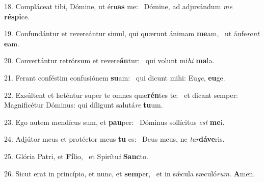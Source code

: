18. Compláceat tibi, Dómine, ut éru\textbf{as} me: \ast\  Dómine, ad adjuvándum \textit{me} \textbf{ré}\textbf{spi}ce.\

19. Confundántur et revereántur simul, qui quærunt ánimam \textbf{me}am, \ast\  ut áufe\textit{rant} \textbf{e}am.\

20. Convertántur retrórsum et revere\textbf{án}tur: \ast\  qui volunt mi\textit{hi} \textbf{ma}la.\

21. Ferant conféstim confusiónem \textbf{su}am: \ast\  qui dicunt mihi: Eu\textit{ge}, \textbf{eu}ge.\

22. Exsúltent et læténtur super te omnes quæ\textbf{rén}tes te: \ast\  et dicant semper: Magnificétur Dóminus: qui díligunt salutá\textit{re} \textbf{tu}um.\

23. Ego autem mendícus sum, et \textbf{pau}per: \ast\  Dóminus sollícitus \textit{est} \textbf{me}i.\

24. Adjútor meus et protéctor meus \textbf{tu} es: \ast\  Deus meus, ne \textit{tar}\textbf{dá}\textbf{ve}ris.\

25. Glória Patri, et \textbf{Fí}lio, \ast\  et Spirítu\textit{i} \textbf{Sanc}to.\

26. Sicut erat in princípio, et nunc, et \textbf{sem}per, \ast\  et in sǽcula sæculó\textit{rum}. \textbf{A}men.\

